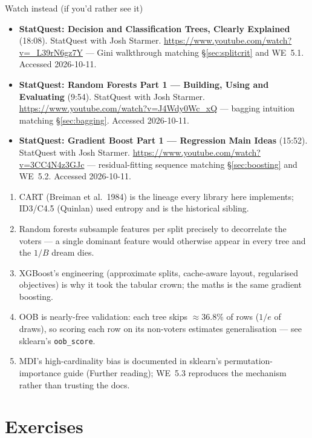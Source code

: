 \begin{rulebox}{Watch instead (if you'd rather see it)}
\begin{itemize}
\item \textbf{StatQuest: Decision and Classification Trees, Clearly
  Explained} (18:08). StatQuest with Josh Starmer.
  \url{https://www.youtube.com/watch?v=_L39rN6gz7Y} --- Gini walkthrough
  matching \S\ref{sec:splitcrit} and WE~5.1. Accessed 2026-10-11.
\item \textbf{StatQuest: Random Forests Part 1 --- Building, Using and
  Evaluating} (9:54). StatQuest with Josh Starmer.
  \url{https://www.youtube.com/watch?v=J4Wdy0Wc_xQ} --- bagging intuition
  matching \S\ref{sec:bagging}. Accessed 2026-10-11.
\item \textbf{StatQuest: Gradient Boost Part 1 --- Regression Main
  Ideas} (15:52). StatQuest with Josh Starmer.
  \url{https://www.youtube.com/watch?v=3CC4N4z3GJc} --- residual-fitting
  sequence matching \S\ref{sec:boosting} and WE~5.2. Accessed 2026-10-11.
\end{itemize}
\end{rulebox}

\chapternotes
\begin{enumerate}
\item CART (Breiman et al.\ 1984) is the lineage every library here
  implements; ID3/C4.5 (Quinlan) used entropy and is the historical
  sibling.
\item Random forests subsample features per split precisely to
  decorrelate the voters --- a single dominant feature would otherwise
  appear in every tree and the $1/B$ dream dies.
\item XGBoost's engineering (approximate splits, cache-aware layout,
  regularised objectives) is why it took the tabular crown; the maths is
  the same gradient boosting.
\item OOB is nearly-free validation: each tree skips $\approx 36.8\%$ of
  rows ($1/e$ of draws), so scoring each row on its non-voters estimates
  generalisation --- see sklearn's \texttt{oob\_score}.
\item MDI's high-cardinality bias is documented in sklearn's
  permutation-importance guide (Further reading); WE~5.3 reproduces the
  mechanism rather than trusting the docs.
\end{enumerate}

\section*{Exercises}


